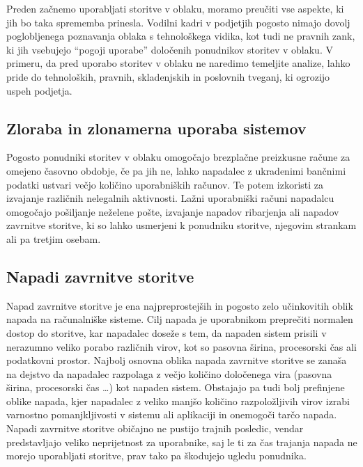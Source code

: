 \documentclass[12pt,a4paper,openany,tikz]{book}
\theoremstyle{plain}
\theoremstyle{definition}
\begin{document}
Preden začnemo uporabljati storitve v oblaku, moramo preučiti vse aspekte, ki jih bo taka sprememba prinesla. Vodilni kadri v podjetjih pogosto nimajo dovolj poglobljenega poznavanja oblaka s tehnološkega vidika, kot tudi ne pravnih zank, ki jih vsebujejo ``pogoji uporabe'' določenih ponudnikov storitev v oblaku. V primeru, da pred uporabo storitev v oblaku ne naredimo temeljite analize, lahko pride do tehnoloških, pravnih, skladenjskih in poslovnih tveganj, ki ogrozijo uspeh podjetja.

\subsection{Zloraba in zlonamerna uporaba sistemov}
\label{sub:Zloraba in zlonamerna uporaba sistemov}

Pogosto ponudniki storitev v oblaku omogočajo brezplačne preizkusne račune za omejeno časovno obdobje, če pa jih ne, lahko napadalec z ukradenimi bančnimi podatki ustvari večjo količino uporabniških računov. Te potem izkoristi za izvajanje različnih nelegalnih aktivnosti. Lažni uporabniški računi napadalcu omogočajo pošiljanje neželene pošte, izvajanje napadov ribarjenja ali napadov zavrnitve storitve, ki so lahko usmerjeni k ponudniku storitve, njegovim strankam ali pa tretjim osebam.

\subsection{Napadi zavrnitve storitve}
\label{subs:Napadi zavrnitve storitve}

Napad zavrnitve storitve je ena najpreprostejših in pogosto zelo učinkovitih oblik napada na računalniške sisteme. Cilj napada je uporabnikom preprečiti normalen dostop do storitve, kar napadalec doseže s tem, da napaden sistem prisili v nerazumno veliko porabo različnih virov, kot so pasovna širina, procesorski čas ali podatkovni prostor. Najbolj osnovna oblika napada zavrnitve storitve se zanaša na dejstvo da napadalec razpolaga z večjo količino določenega vira (pasovna širina, procesorski čas …) kot napaden sistem. Obstajajo pa tudi bolj prefinjene oblike napada, kjer napadalec z veliko manjšo količino razpoložljivih virov izrabi varnostno pomanjkljivosti v sistemu ali aplikaciji in onemogoči tarčo napada. Napadi zavrnitve storitve običajno ne pustijo trajnih posledic, vendar predstavljajo veliko neprijetnost za uporabnike, saj le ti za čas trajanja napada ne morejo uporabljati storitve, prav tako pa škodujejo ugledu ponudnika.
\end{document}
